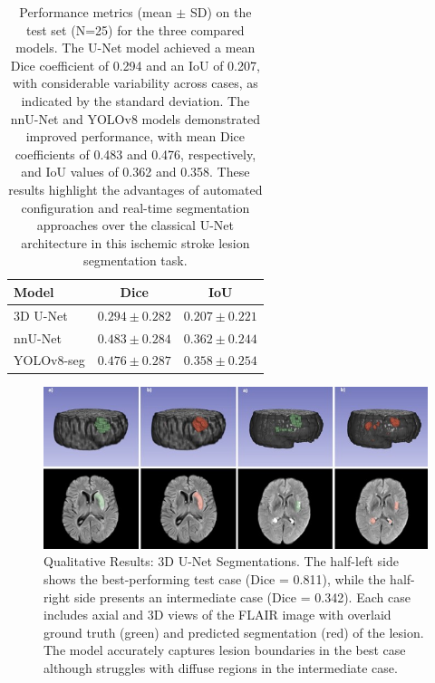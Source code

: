 \documentclass[12pt]{article}
\begin{document}
\begin{table}[tp]
\centering
\caption{Performance metrics (mean $\pm$ SD) on the test set (N=25) for the three compared models. The U-Net model achieved a mean Dice coefficient of 0.294 and an IoU of 0.207, with considerable variability across cases, as indicated by the standard deviation. The nnU-Net and YOLOv8 models demonstrated improved performance, with mean Dice coefficients of 0.483 and 0.476, respectively, and IoU values of 0.362 and 0.358. These results highlight the advantages of automated configuration and real-time segmentation approaches over the classical U-Net architecture in this ischemic stroke lesion segmentation task.}\label{tab:comparative_metrics}
\label{tab:comparative_metrics}
\begin{tabular}{lcc}
\toprule
Model & Dice & IoU \\
\midrule
3D U-Net       & $0.294 \pm 0.282$ & $0.207 \pm 0.221$ \\
nnU-Net        & $0.483 \pm 0.284$ & $0.362 \pm 0.244$ \\
YOLOv8-seg     & $0.476 \pm 0.287$ & $0.358 \pm 0.254$ \\
\bottomrule
\end{tabular}
\end{table}
%
\begin{figure}[tp]
    \centering
    \includegraphics[width=\textwidth]{figures/Figure 2.jpg}
    \caption{Qualitative Results: 3D U-Net Segmentations. The half-left side shows the best-performing test case (Dice = 0.811), while the half-right side presents an intermediate case (Dice = 0.342). Each case includes axial and 3D views of the FLAIR image with overlaid ground truth (green) and predicted segmentation (red) of the lesion. The model accurately captures lesion boundaries in the best case although struggles with diffuse regions in the intermediate case.}
    \label{fig:unet_qualitative}
\end{figure}
\end{document}
